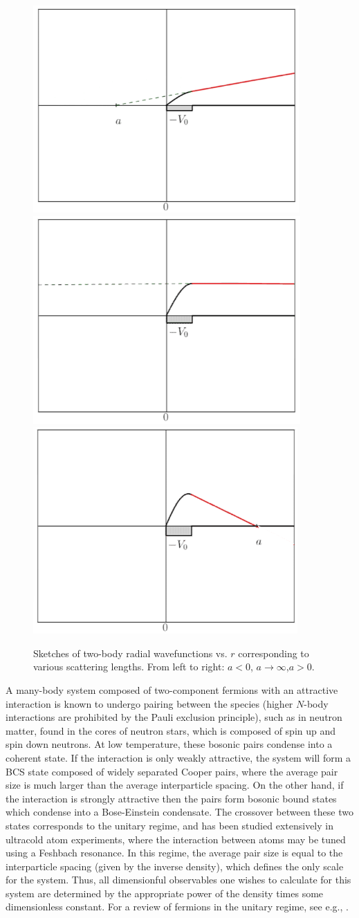 \begin{figure}
\begin{center}
\includegraphics[width=0.3\linewidth]{Chapter5-figures/al0.png}
\includegraphics[width=0.3\linewidth]{Chapter5-figures/ae0.png}
\includegraphics[width=0.3\linewidth]{Chapter5-figures/ag0.png}
\caption{\label{fig:a0}Sketches of two-body radial wavefunctions vs. $r$ corresponding to various scattering lengths. From left to right: $a<0$, $a\to\infty$,$a>0$.}
\end{center}
\end{figure}

A many-body system composed of two-component fermions with an attractive interaction is known to undergo pairing between the species (higher $N$-body interactions are prohibited by the Pauli exclusion principle), such as in neutron matter, found in the cores of neutron stars, which is composed of spin up and spin down neutrons. At low temperature, these bosonic pairs condense into a coherent state. If the interaction is only weakly attractive, the system will form a BCS state composed of widely separated Cooper pairs, where the average pair size is much larger than the average interparticle spacing. On the other hand, if the interaction is strongly attractive then the pairs form bosonic bound states which condense into a Bose-Einstein condensate. The crossover between these two states corresponds to the unitary regime, and has been studied extensively in ultracold atom experiments, where the interaction between atoms may be tuned using a Feshbach resonance. In this regime, the average pair size is equal to the interparticle spacing (given by the inverse density), which defines the only scale for the system. Thus, all dimensionful observables one wishes to calculate for this system are determined by the appropriate power of the density times some dimensionless constant.  For a review of fermions in the unitary regime, see e.g., \cite{AtomsReview1,AtomsReview2}.

